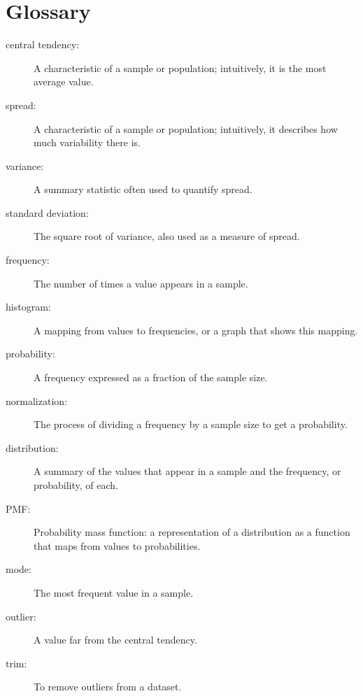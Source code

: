 \documentclass[12pt]{book}
\begin{document}
\section{Glossary}

\begin{description}

\item[central tendency:] A characteristic of a sample or population;
intuitively, it is the most average value. 

\item[spread:] A characteristic of a sample or population;
intuitively, it describes how much variability there is.

\item[variance:] A summary statistic often used to quantify spread.

\item[standard deviation:] The square root of variance, also used
as a measure of spread.

\item[frequency:] The number of times a value appears in a sample.

\item[histogram:] A mapping from values to frequencies, or a graph
that shows this mapping.

\item[probability:] A frequency expressed as a fraction of the sample
size.

\item[normalization:] The process of dividing a frequency by a sample
size to get a probability.

\item[distribution:] A summary of the values that appear in a sample
and the frequency, or probability, of each.

\item[PMF:] Probability mass function: a representation of a distribution
as a function that maps from values to probabilities.

\item[mode:] The most frequent value in a sample.

\item[outlier:] A value far from the central tendency.

\item[trim:] To remove outliers from a dataset.


\end{description}
\end{document}
